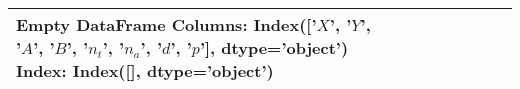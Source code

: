 \begin{tabular}{lllllllll}
\toprule
Empty DataFrame
Columns: Index(['$X$', '$Y$', '$A$', '$B$', '$n_t$', '$n_a$', '$d$', '$p$'], dtype='object')
Index: Index([], dtype='object') \\
\bottomrule
\end{tabular}
